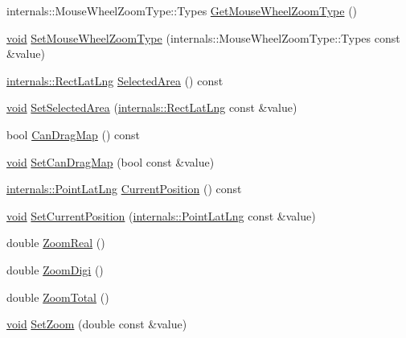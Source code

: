\begin{DoxyCompactItemize}
\item 
internals\-::\-Mouse\-Wheel\-Zoom\-Type\-::\-Types \hyperlink{group___o_p_map_widget_gaccdd5b2b818dd9add21788954c49eabe}{\-Get\-Mouse\-Wheel\-Zoom\-Type} ()
\item 
\hyperlink{group___u_a_v_objects_plugin_ga444cf2ff3f0ecbe028adce838d373f5c}{void} \hyperlink{group___o_p_map_widget_ga24fd1f0f732f8306c89d00997f9957e1}{\-Set\-Mouse\-Wheel\-Zoom\-Type} (internals\-::\-Mouse\-Wheel\-Zoom\-Type\-::\-Types const \&value)
\item 
\hyperlink{structinternals_1_1_rect_lat_lng}{internals\-::\-Rect\-Lat\-Lng} \hyperlink{group___o_p_map_widget_gaa5afd1049e526ae7424065bca8308106}{\-Selected\-Area} () const 
\item 
\hyperlink{group___u_a_v_objects_plugin_ga444cf2ff3f0ecbe028adce838d373f5c}{void} \hyperlink{group___o_p_map_widget_ga39fb72ad777f823ecaba3f30feb9e623}{\-Set\-Selected\-Area} (\hyperlink{structinternals_1_1_rect_lat_lng}{internals\-::\-Rect\-Lat\-Lng} const \&value)
\item 
bool \hyperlink{group___o_p_map_widget_ga2c73815e5add0186091174a0dabad975}{\-Can\-Drag\-Map} () const 
\item 
\hyperlink{group___u_a_v_objects_plugin_ga444cf2ff3f0ecbe028adce838d373f5c}{void} \hyperlink{group___o_p_map_widget_ga8e9c310f8929536de86a8ed730abde94}{\-Set\-Can\-Drag\-Map} (bool const \&value)
\item 
\hyperlink{structinternals_1_1_point_lat_lng}{internals\-::\-Point\-Lat\-Lng} \hyperlink{group___o_p_map_widget_ga5da99e2dca74bad302e2a35466a5a2fc}{\-Current\-Position} () const 
\item 
\hyperlink{group___u_a_v_objects_plugin_ga444cf2ff3f0ecbe028adce838d373f5c}{void} \hyperlink{group___o_p_map_widget_ga5144489a16c9bd07abbd0d8adc01656d}{\-Set\-Current\-Position} (\hyperlink{structinternals_1_1_point_lat_lng}{internals\-::\-Point\-Lat\-Lng} const \&value)
\item 
double \hyperlink{group___o_p_map_widget_gae56c86fccffa01f54944d431af98a7b9}{\-Zoom\-Real} ()
\item 
double \hyperlink{group___o_p_map_widget_gaf7a725070972e7158ec0f5b10a0d9cd3}{\-Zoom\-Digi} ()
\item 
double \hyperlink{group___o_p_map_widget_ga2060cbfea71913a458f3a6f0c6dad8c5}{\-Zoom\-Total} ()
\item 
\hyperlink{group___u_a_v_objects_plugin_ga444cf2ff3f0ecbe028adce838d373f5c}{void} \hyperlink{group___o_p_map_widget_ga63fe346f4ea58f09453ccd42ffe87260}{\-Set\-Zoom} (double const \&value)

\end{DoxyCompactItemize}

